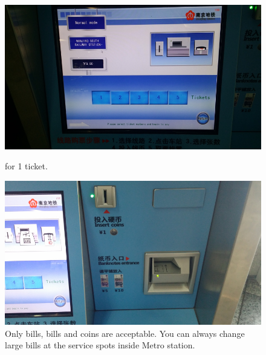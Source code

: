 \documentclass[11pt]{article}
\begin{document}
 \begin{figure}[!h]
	\begin{minipage}[t]{.5\textwidth}
     	\centering
        	\includegraphics[scale=0.27]{20150331_110642.jpg}
		\caption{ for 1 ticket.\label{20150331_110642}}
	\end{minipage}%
     \begin{minipage}[t]{.5\textwidth}
         \centering
       	 \includegraphics[scale=0.27]{20150331_110651.jpg}
	 	 \caption{Only  bills,   bills and  coins are acceptable. 
		 	You can always change large bills at the service spots inside Metro station.\label{20150331_110651}}
    \end{minipage}%
 \end{figure}
\end{document}

